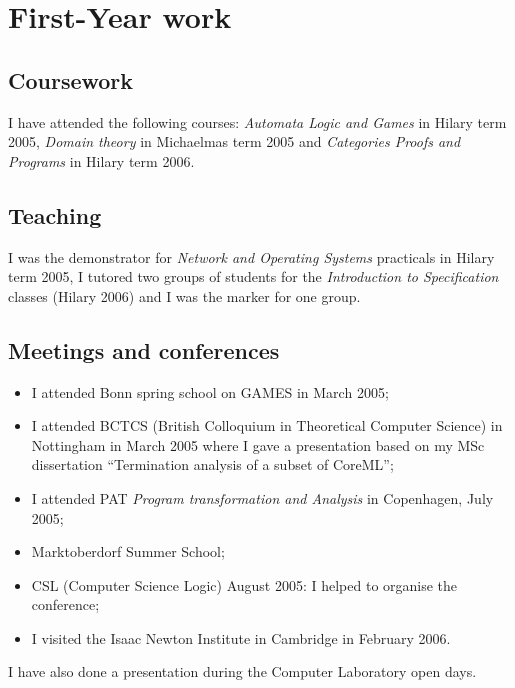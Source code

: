 \chapapp{}

\chapter{First-Year work}

\section{Coursework}
I have attended the following courses: \emph{Automata Logic and
Games} in Hilary term 2005, \emph{Domain theory} in Michaelmas term
2005 and \emph{Categories Proofs and Programs} in Hilary term 2006.

\section{Teaching}

I was the demonstrator for \emph{Network and Operating Systems}
practicals in Hilary term 2005, I tutored two groups of students for
the \emph{Introduction to Specification} classes (Hilary 2006) and I
was the marker for one group.

\section{Meetings and conferences}
\begin{itemize}
\item I attended Bonn spring school on GAMES in March 2005;

\item  I attended BCTCS (British Colloquium in
Theoretical Computer Science) in Nottingham in March 2005 where I
gave a presentation based on my MSc dissertation ``Termination
analysis of a subset of CoreML'';

\item I attended PAT \emph{Program transformation and Analysis} in Copenhagen, July 2005;

\item Marktoberdorf Summer School;
\item CSL (Computer Science Logic) August 2005:
I helped to organise the conference;
\item I visited the Isaac Newton Institute in Cambridge in February
2006.
\end{itemize}
I have also done a presentation during the Computer Laboratory open
days.


